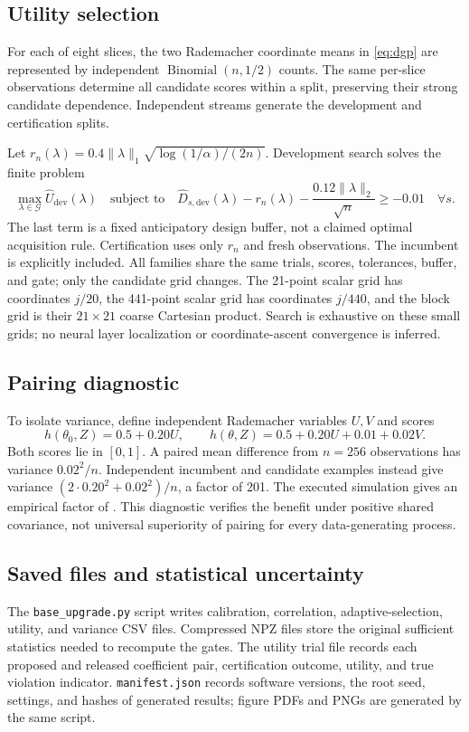 \documentclass[11pt,letterpaper]{article}
\newcommand{\old}{\theta_0}
\begin{document}
\subsection{Utility selection}
For each of eight slices, the two Rademacher coordinate means in \eqref{eq:dgp} are represented by independent $\operatorname{Binomial}(n,1/2)$ counts. The same per-slice observations determine all candidate scores within a split, preserving their strong candidate dependence. Independent streams generate the development and certification splits.

Let $r_n(\lambda)=0.4\|\lambda\|_1\sqrt{\log(1/\alpha)/(2n)}$. Development search solves the finite problem
\begin{equation}
\max_{\lambda\in\mathcal G}\widehat U_{\mathrm{dev}}(\lambda)
\quad\text{subject to}\quad
\widehat D_{s,\mathrm{dev}}(\lambda)-r_n(\lambda)
-\frac{0.12\|\lambda\|_2}{\sqrt n}\geq-0.01\quad\forall s.
\label{eq:devsearch}
\end{equation}
The last term is a fixed anticipatory design buffer, not a claimed optimal acquisition rule. Certification uses only $r_n$ and fresh observations. The incumbent is explicitly included. All families share the same trials, scores, tolerances, buffer, and gate; only the candidate grid changes. The 21-point scalar grid has coordinates $j/20$, the 441-point scalar grid has coordinates $j/440$, and the block grid is their $21\times21$ coarse Cartesian product. Search is exhaustive on these small grids; no neural layer localization or coordinate-ascent convergence is inferred.

\subsection{Pairing diagnostic}
To isolate variance, define independent Rademacher variables $U,V$ and scores
\[
h(\old,Z)=0.5+0.20U,\qquad
h(\theta,Z)=0.5+0.20U+0.01+0.02V.
\]
Both scores lie in $[0,1]$. A paired mean difference from $n=256$ observations has variance $0.02^2/n$. Independent incumbent and candidate examples instead give variance $(2\cdot0.20^2+0.02^2)/n$, a factor of 201. The executed simulation gives an empirical factor of \VarianceRatio. This diagnostic verifies the benefit under positive shared covariance, not universal superiority of pairing for every data-generating process.

\subsection{Saved files and statistical uncertainty}
The \texttt{base\_upgrade.py} script writes calibration, correlation, adaptive-selection, utility, and variance CSV files. Compressed NPZ files store the original sufficient statistics needed to recompute the gates. The utility trial file records each proposed and released coefficient pair, certification outcome, utility, and true violation indicator. \texttt{manifest.json} records software versions, the root seed, settings, and hashes of generated results; figure PDFs and PNGs are generated by the same script.
\end{document}
